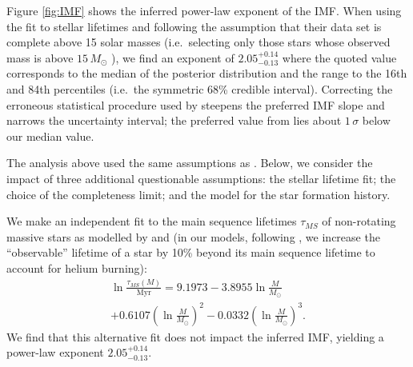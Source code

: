 \documentclass[apjl]{emulateapj}
\newcommand{\onesigrange}[3]{\ensuremath{#1^{+#2}_{-#3}}}
\newcommand{\alpharangeone}{\onesigrange{2.05}{0.14}{0.13}}
\newcommand{\alpharangetwo}{\onesigrange{2.05}{0.14}{0.13}}
\begin{document}
Figure \ref{fig:IMF} shows the inferred power-law exponent of the IMF.   When
using the \citet{Schneider:2018}  fit to stellar lifetimes and following the assumption
that their data set is complete above 15 solar masses (i.e.\ selecting only
those stars whose observed mass is above $15 \, M_\odot$
\citep{Loredo:2004,BBH:O1}), we find
an exponent of $\alpharangeone$ where the quoted value corresponds to the median
of the posterior distribution and the range to the 16th and 84th percentiles
(i.e.\ the symmetric 68\% credible interval).  Correcting the erroneous
statistical procedure used by \citet{Schneider:2018} steepens the preferred IMF
slope and narrows the uncertainty interval; the preferred value from
\citet{Schneider:2018} lies about $1\, \sigma$ below our median value.

The analysis above used the same assumptions as \citet{Schneider:2018}.  Below, we consider the impact of three additional questionable assumptions: the stellar lifetime fit; the choice of the completeness limit; and the model for the star formation history.

We make an independent fit to the main sequence lifetimes
$\tau_{MS}$ of non-rotating massive stars as modelled by \citet{Brott:2011} and \citet{Kohler:2015} (in
our models, following \citet{Schneider:2018}, we increase the ``observable''
lifetime of a star by 10\% beyond its main sequence lifetime to account for
helium burning):
%
\begin{multline}
\ln \frac{\tau_{MS} (M)}{\textrm{Myr}} = 9.1973 - 3.8955 \ln\frac{M}{M_\odot} \\ + 0.6107 \left(\ln\frac{M}{M_\odot} \right)^2 - 0.0332 \left(\ln\frac{M}{M_\odot}\right)^3.
\end{multline}
We find that this alternative fit does not impact the inferred IMF, yielding a power-law exponent $\alpharangetwo$.
\end{document}
